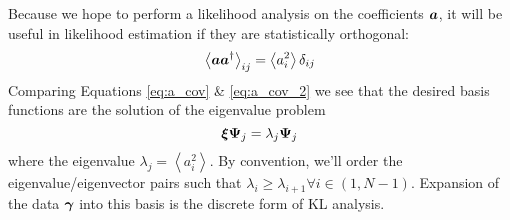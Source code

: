Because we hope to perform a likelihood analysis on the coefficients
$\boldsymbol{a}$, it will be useful in likelihood estimation if they are
statistically orthogonal:
\begin{equation}
  \label{eq:a_cov_2}
  \left\langle \boldsymbol{a}\boldsymbol{a}^\dagger \right\rangle_{ij}
  = \left\langle a_i^2 \right\rangle \delta_{ij}
\end{equation}
Comparing Equations \ref{eq:a_cov} \& \ref{eq:a_cov_2} we see that the desired
basis functions are the solution of the eigenvalue problem
\begin{equation}
  \boldsymbol{\xi} \boldsymbol{\Psi}_j = \lambda_j \boldsymbol{\Psi}_j
\end{equation}
where the eigenvalue $\lambda_j = \left\langle a_i^2 \right\rangle$.
By convention, we'll order the eigenvalue/eigenvector pairs such that
$\lambda_i \ge \lambda_{i+1} \forall i\in(1, N-1)$.
Expansion of the data $\boldsymbol{\gamma}$ into this basis is the discrete form
of KL analysis.

